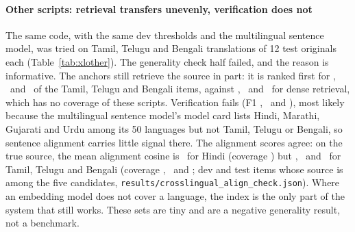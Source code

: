 \documentclass[11pt,a4paper]{article}
\newcommand{\code}[1]{\texttt{#1}}
\begin{document}
\paragraph{Other scripts: retrieval transfers unevenly, verification does not}
The same code, with the same dev thresholds and the multilingual sentence model, was tried on Tamil, Telugu and Bengali translations of 12 test originals each (Table~\ref{tab:xlother}). The generality check half failed, and the reason is informative. The anchors still retrieve the source in part: it is ranked first for \nTaPone, \nTePone\ and \nBnPone\ of the Tamil, Telugu and Bengali items, against \nDenseTaPone, \nDenseTePone\ and \nDenseBnPone\ for dense retrieval, which has no coverage of these scripts. Verification fails (F1 \nTaF, \nTeF\ and \nBnF), most likely because the multilingual sentence model's model card lists Hindi, Marathi, Gujarati and Urdu among its 50 languages but not Tamil, Telugu or Bengali, so sentence alignment carries little signal there. The alignment scores agree: on the true source, the mean alignment cosine is \nAlignHi\ for Hindi (coverage \nAlignCovHi) but \nAlignTa, \nAlignTe\ and \nAlignBn\ for Tamil, Telugu and Bengali (coverage \nAlignCovTa, \nAlignCovTe\ and \nAlignCovBn; dev and test items whose source is among the five candidates, \code{results/crosslingual\_align\_check.json}). Where an embedding model does not cover a language, the index is the only part of the system that still works. These sets are tiny and are a negative generality result, not a benchmark.

\begin{table}[t]
  \centering\small
  \caption{Other scripts, test split, 12 originals per language. Retrieval from anchors transfers (first rows); the sentence-embedding verifier does not (last row). Intervals are in \code{results/crosslingual\_ranking.csv}.}
  \label{tab:xlother}
  \footnotesize
  
\end{table}
\end{document}
